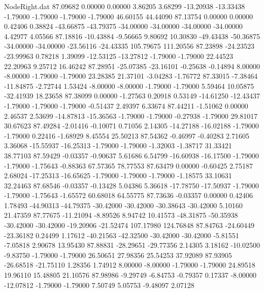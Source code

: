 \begin{filecontents}{NodeRight.dat}
  87.09682    0.00000    0.00000     3.86205    3.68299  -13.20938  -13.33438   -1.79000   -1.79000   -1.79000   -1.79000   46.60155   44.44090
  87.13754    0.00000    0.00000     0.42406    0.38824  -43.66875  -43.79375  -34.00000  -34.00000  -34.00000  -34.00000    4.42977    4.05566
  87.18816  -10.43884   -9.56665     9.80692   10.30830  -49.43438  -50.36875  -34.00000  -34.00000  -23.56116  -24.43335  105.79675  111.20556
  87.23898  -24.23523  -23.99963     0.78218    1.39099  -12.53125  -13.27812   -1.79000   -1.79000   22.44523   22.20963    9.25712   16.46242
  87.28951  -25.07385  -23.16101    -0.25638   -0.14894    8.00000   -8.00000   -1.79000   -1.79000   23.28385   21.37101   -3.04283   -1.76772
  87.33015   -7.38464  -11.84875    -2.72744    1.53424   -8.00000   -8.00000   -1.79000   -1.79000    5.59464   10.05875  -32.41939   18.23658
  87.38099    0.00000   -1.27563     0.20918    0.53149  -14.61250  -12.43437   -1.79000   -1.79000   -1.79000   -0.51437    2.49397    6.33674
  87.44211   -1.51062    0.00000     2.46537    2.53699  -14.87813  -15.36563   -1.79000   -1.79000   -0.27938   -1.79000   29.81017   30.67623
  87.49284   -2.01416   -0.10071     0.71056    2.14305  -14.27188  -16.02188   -1.79000   -1.79000    0.22416   -1.68929    8.45554   25.50213
  87.54362   -0.46997   -0.40283     2.71605    3.36068  -15.55937  -16.25313   -1.79000   -1.79000   -1.32003   -1.38717   31.33421   38.77103
  87.59429   -0.03357   -0.90637     5.61686    6.54799  -16.60938  -16.17500   -1.79000   -1.79000   -1.75643   -0.88363   67.57365   78.77553
  87.63479    0.00000   -0.60425     2.75187    2.68024  -17.25313  -16.65625   -1.79000   -1.79000   -1.79000   -1.18575   33.10631   32.24463
  87.68546   -0.03357   -0.13428     5.04386    5.36618  -17.78750  -17.50937   -1.79000   -1.79000   -1.75643   -1.65572   60.68018   64.55775
  87.73636   -0.03357    0.00000     0.42406    1.78493  -44.90313  -44.79375  -30.42000  -30.42000  -30.38643  -30.42000    5.10160   21.47359
  87.77675  -11.21094   -8.89526     8.94742   10.41573  -48.31875  -50.35938  -30.42000  -30.42000  -19.20906  -21.52474  107.17980  124.76848
  87.84763  -24.60449  -23.36182     0.24499    1.17612  -40.21563  -42.32500  -30.42000  -30.42000   -5.81551   -7.05818    2.90678   13.95430
  87.88831  -28.29651  -29.77356     2.14305    3.18162  -10.02500   -9.83750   -1.79000   -1.79000   26.50651   27.98356   25.54253   37.92089
  87.93905  -26.68518  -21.75110     1.28356    1.74912    8.00000   -8.00000   -1.79000   -1.79000   24.89518   19.96110   15.48805   21.10576
  87.98986   -9.29749   -6.84753    -0.79357    0.17337   -8.00000  -12.07812   -1.79000   -1.79000    7.50749    5.05753   -9.48097    2.07128

\end{filecontents}
